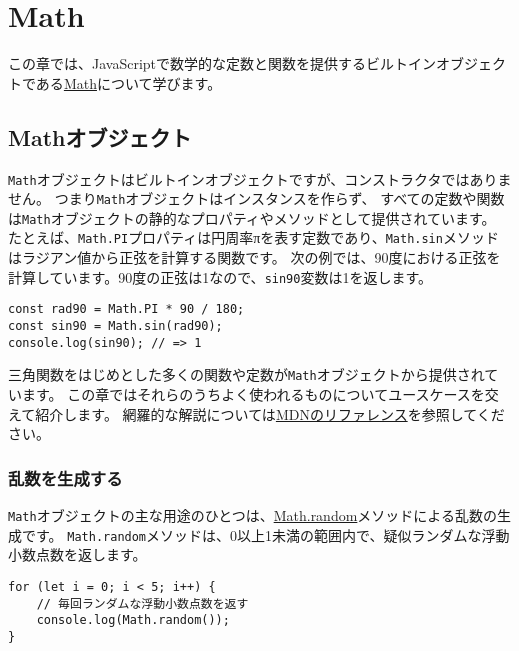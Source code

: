 \hypertarget{math}{%
\chapter{Math}\label{math}}

この章では、JavaScriptで数学的な定数と関数を提供するビルトインオブジェクトである\href{https://developer.mozilla.org/ja/docs/Web/JavaScript/Reference/Global_Objects/Math}{Math}について学びます。

\hypertarget{math-object}{%
\section{Mathオブジェクト}\label{math-object}}

\texttt{Math}オブジェクトはビルトインオブジェクトですが、コンストラクタではありません。
つまり\texttt{Math}オブジェクトはインスタンスを作らず、
すべての定数や関数は\texttt{Math}オブジェクトの静的なプロパティやメソッドとして提供されています。
たとえば、\texttt{Math.PI}プロパティは円周率πを表す定数であり、\texttt{Math.sin}メソッドはラジアン値から正弦を計算する関数です。
次の例では、90度における正弦を計算しています。90度の正弦は1なので、\texttt{sin90}変数は1を返します。

\begin{lstlisting}
const rad90 = Math.PI * 90 / 180;
const sin90 = Math.sin(rad90);
console.log(sin90); // => 1
\end{lstlisting}

三角関数をはじめとした多くの関数や定数が\texttt{Math}オブジェクトから提供されています。
この章ではそれらのうちよく使われるものについてユースケースを交えて紹介します。
網羅的な解説については\href{https://developer.mozilla.org/ja/docs/Web/JavaScript/Reference/Global_Objects/Math}{MDNのリファレンス}を参照してください。

\hypertarget{create-random-number}{%
\subsection{乱数を生成する}\label{create-random-number}}

\texttt{Math}オブジェクトの主な用途のひとつは、\href{https://developer.mozilla.org/ja/docs/Web/JavaScript/Reference/Global_Objects/Math/random}{Math.random}メソッドによる乱数の生成です。
\texttt{Math.random}メソッドは、0以上1未満の範囲内で、疑似ランダムな浮動小数点数を返します。

\begin{lstlisting}
for (let i = 0; i < 5; i++) {
    // 毎回ランダムな浮動小数点数を返す
    console.log(Math.random());
}
\end{lstlisting}

